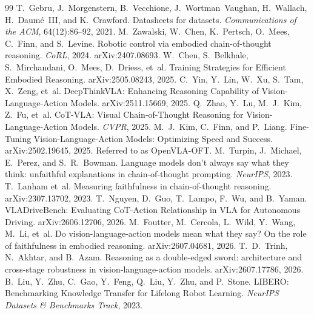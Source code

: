 \documentclass{article}
\begin{document}
\begin{thebibliography}{99}
 T.~Gebru, J.~Morgenstern, B.~Vecchione, J.~Wortman~Vaughan, H.~Wallach, H.~Daum\'e~III, and K.~Crawford. Datasheets for datasets. \emph{Communications of the ACM}, 64(12):86--92, 2021.
 M.~Zawalski, W.~Chen, K.~Pertsch, O.~Mees, C.~Finn, and S.~Levine. Robotic control via embodied chain-of-thought reasoning. \emph{CoRL}, 2024. arXiv:2407.08693.
 W.~Chen, S.~Belkhale, S.~Mirchandani, O.~Mees, D.~Driess, et~al. Training Strategies for Efficient Embodied Reasoning. arXiv:2505.08243, 2025.
 C.~Yin, Y.~Lin, W.~Xu, S.~Tam, X.~Zeng, et~al. DeepThinkVLA: Enhancing Reasoning Capability of Vision-Language-Action Models. arXiv:2511.15669, 2025.
 Q.~Zhao, Y.~Lu, M.~J.~Kim, Z.~Fu, et~al. {CoT-VLA}: Visual Chain-of-Thought Reasoning for Vision-Language-Action Models. \emph{CVPR}, 2025.
 M.~J.~Kim, C.~Finn, and P.~Liang. Fine-Tuning Vision-Language-Action Models: Optimizing Speed and Success. arXiv:2502.19645, 2025. Referred to as OpenVLA-OFT.
 M.~Turpin, J.~Michael, E.~Perez, and S.~R.~Bowman. Language models don't always say what they think: unfaithful explanations in chain-of-thought prompting. \emph{NeurIPS}, 2023.
 T.~Lanham et~al. Measuring faithfulness in chain-of-thought reasoning. arXiv:2307.13702, 2023.
 T.~Nguyen, D.~Guo, T.~Lampo, F.~Wu, and B.~Yaman. {VLADriveBench}: Evaluating CoT-Action Relationship in VLA for Autonomous Driving. arXiv:2606.12706, 2026.
 M.~Foutter, M.~Cercola, L.~Wild, Y.~Wang, M.~Li, et~al. Do vision-language-action models mean what they say? On the role of faithfulness in embodied reasoning. arXiv:2607.04681, 2026.
 T.~D.~Trinh, N.~Akhtar, and B.~Azam. Reasoning as a double-edged sword: architecture and cross-stage robustness in vision-language-action models. arXiv:2607.17786, 2026.
 B.~Liu, Y.~Zhu, C.~Gao, Y.~Feng, Q.~Liu, Y.~Zhu, and P.~Stone. {LIBERO}: Benchmarking Knowledge Transfer for Lifelong Robot Learning. \emph{NeurIPS Datasets \& Benchmarks Track}, 2023.

\end{thebibliography}
\end{document}
